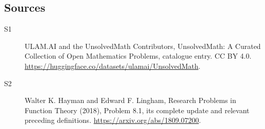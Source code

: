 \documentclass[11pt]{article}
\begin{document}
\subsection{Sources}
\begin{description}
\item[\hypertarget{source:statement:1}{S1}] ULAM.AI and the UnsolvedMath Contributors, UnsolvedMath: A Curated Collection of Open Mathematics Problems, catalogue entry. CC BY 4.0. \url{https://huggingface.co/datasets/ulamai/UnsolvedMath}.
\item[\hypertarget{source:statement:2}{S2}] Walter K. Hayman and Edward F. Lingham, Research Problems in Function Theory (2018), Problem 8.1, its complete update and relevant preceding definitions. \url{https://arxiv.org/abs/1809.07200}.
\end{description}
\label{end:statement}
\end{document}
